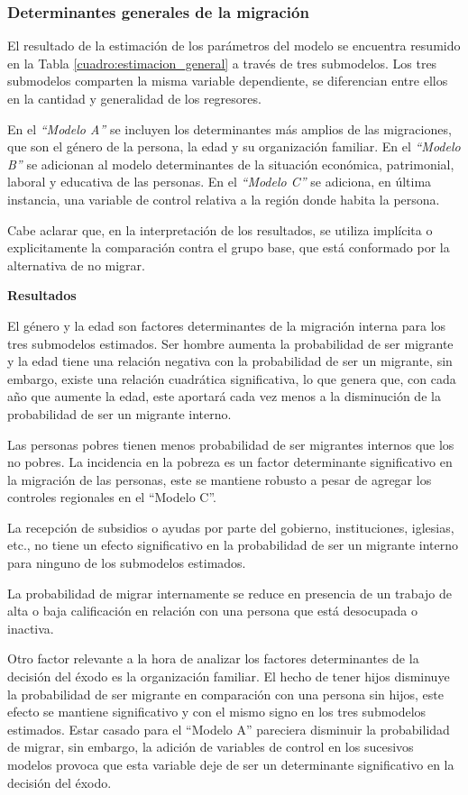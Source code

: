 \documentclass[12pt,a4paper]{article}
\begin{document}
\subsubsection{Determinantes generales de la migración}
El resultado de la estimación de los parámetros del modelo se encuentra resumido en la Tabla \ref{cuadro:estimacion_general} a través de tres submodelos.
Los tres submodelos comparten la misma variable dependiente, se diferencian entre ellos en la cantidad y generalidad de los regresores.

En el \textit{``Modelo A''} se incluyen los determinantes más amplios de las migraciones, que son el género de la persona, la edad y su organización familiar.
En el \textit{``Modelo B''} se adicionan al modelo determinantes de la situación económica, patrimonial, laboral y educativa de las personas.
En el \textit{``Modelo C''} se adiciona, en última instancia, una variable de control relativa a la región donde habita la persona.

Cabe aclarar que, en la interpretación de los resultados, se utiliza implícita o explicitamente la comparación contra el grupo base, que está conformado por la alternativa de no migrar.

\textbf{Resultados}

El género y la edad son factores determinantes de la migración interna para los tres submodelos estimados. Ser hombre aumenta la probabilidad de ser migrante y la edad tiene una relación negativa con la probabilidad de ser un migrante, sin embargo, existe una relación cuadrática significativa, lo que genera que, con cada año que aumente la edad, este aportará cada vez menos a la disminución de  la probabilidad de ser un migrante interno.

Las personas pobres tienen menos probabilidad de ser migrantes internos que los no pobres. La incidencia en la pobreza es un factor determinante significativo en la migración de las personas, este se mantiene robusto a pesar de agregar los controles regionales en el ``Modelo C''. 

La recepción de subsidios o ayudas por parte del gobierno, instituciones, iglesias, etc., no tiene un efecto significativo en la probabilidad de ser un migrante interno para ninguno de los submodelos estimados. 

La probabilidad de migrar internamente se reduce en presencia de un trabajo de alta o baja calificación en relación con una persona que está desocupada o inactiva.

Otro factor relevante a la hora de analizar los factores determinantes de la decisión del éxodo es la organización familiar. El hecho de tener hijos disminuye la probabilidad de ser migrante en comparación con una persona sin hijos, este efecto se mantiene significativo y con el mismo signo en los tres submodelos estimados. Estar casado para el ``Modelo A'' pareciera disminuir la probabilidad de migrar, sin embargo, la adición de variables de control en los sucesivos modelos provoca que esta variable deje de ser un determinante significativo en la decisión del éxodo.
\end{document}
